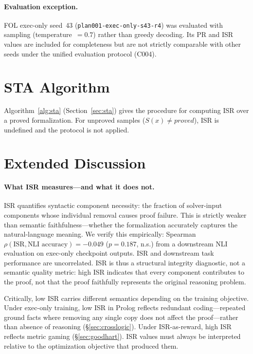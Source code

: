 \paragraph{Evaluation exception.}
FOL exec-only seed~43 (\texttt{plan001-exec-only-s43-r4}) was evaluated with sampling (temperature~$=0.7$) rather than greedy decoding.
Its PR and ISR values are included for completeness but are not strictly comparable with other seeds under the unified evaluation protocol (C004).


\section{STA Algorithm}
\label{app:algorithm}

Algorithm~\ref{alg:sta} (Section~\ref{sec:sta}) gives the procedure for computing ISR over a proved formalization.
For unproved samples ($S(x) \neq \textit{proved}$), ISR is undefined and the protocol is not applied.


\section{Extended Discussion}
\label{app:extended-discussion}

\paragraph{What ISR measures---and what it does not.}
ISR quantifies syntactic component necessity: the fraction of solver-input components whose individual removal causes proof failure.
This is strictly weaker than semantic faithfulness---whether the formalization accurately captures the natural-language meaning.
We verify this empirically: Spearman $\rho(\text{ISR}, \text{NLI accuracy}) = -0.049$ ($p = 0.187$, n.s.) from a downstream NLI evaluation on exec-only checkpoint outputs.
ISR and downstream task performance are uncorrelated.
ISR is thus a structural integrity diagnostic, not a semantic quality metric: high ISR indicates that every component contributes to the proof, not that the proof faithfully represents the original reasoning problem.

Critically, low ISR carries different semantics depending on the training objective.
Under exec-only training, low ISR in Prolog reflects redundant coding---repeated ground facts where removing any single copy does not affect the proof---rather than absence of reasoning (\S\ref{sec:crosslogic}).
Under ISR-as-reward, high ISR reflects metric gaming (\S\ref{sec:goodhart}).
ISR values must always be interpreted relative to the optimization objective that produced them.

